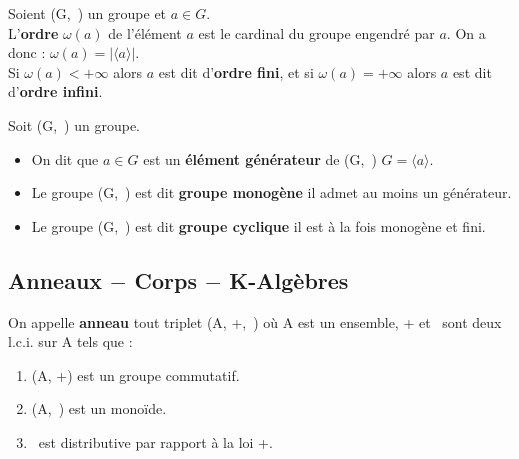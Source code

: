 \vspace{1cm}

Soient (G,\ \lci) un groupe et \(a\in G\).\\
L'\textbf{ordre} \(\omega(a)\) de l'élément \(a\) est le cardinal du groupe engendré par \(a\). On a donc : \(\omega(a)=| \langle a  \rangle|\).\vspace{0.1cm}\\
Si \(\omega(a)<+\infty\) alors \(a\) est dit d'\textbf{ordre fini}, et si \(\omega(a)=+\infty\) alors \(a\) est dit d'\textbf{ordre infini}.

\vspace{1.3cm}

Soit (G,\ \lci) un groupe.
\begin{itemize}[leftmargin=2cm, label=•]
    \item On dit que \(a\in G\) est un \textbf{élément générateur} de (G,\ \lci) \ssi \(G=\bigl \langle a \bigr \rangle\).\vspace{0.1cm}
    
    \item Le groupe (G,\ \lci) est dit \textbf{groupe monogène} \ssi il admet au moins un générateur.\vspace{0.1cm}
    
    \item Le groupe (G,\ \lci) est dit \textbf{groupe cyclique} \ssi il est à la fois monogène et fini.
\end{itemize}


\vspace{1cm}

\subsection{Anneaux $-$ Corps $-$ K-Algèbres}

\vspace{1cm}

On appelle \textbf{anneau} tout triplet (A, +,\ \x) où A est un ensemble, + et \x \ sont deux l.c.i. sur A tels que :\vspace{-0.3cm}
\begin{enumerate}[leftmargin=2cm]
    \item (A, +) est un groupe commutatif.\vspace{0.1cm}
    
    \item (A,\ \x) est un monoïde.\vspace{0.1cm}
    
    \item \x \ est distributive par rapport à la loi +.\vspace{0.1cm}
\end{enumerate}

